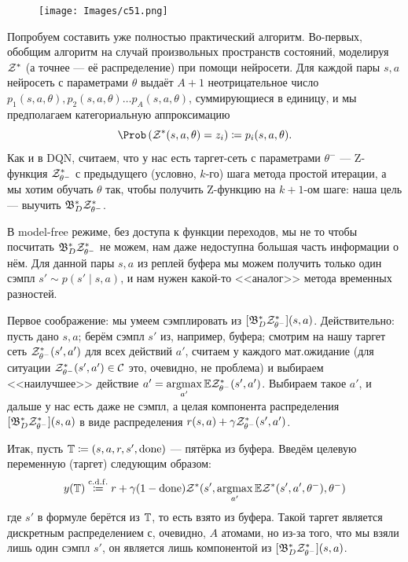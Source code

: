 \begin{figure}
\vspace{-0.5cm}
\centering
\texttt{[image: Images/c51.png]}
\vspace{-0.5cm}
\end{figure}
Попробуем составить уже полностью практический алгоритм. Во-первых, обобщим алгоритм на случай произвольных пространств состояний, моделируя $\mathcal{Z}^*$ (а точнее --- её распределение) при помощи нейросети. Для каждой пары $s, a$ нейросеть с параметрами $\theta$ выдаёт $A+1$ неотрицательное число $p_1(s, a, \theta), p_2(s, a, \theta) \dots p_A(s, a, \theta)$, суммирующиеся в единицу, и мы предполагаем категориальную аппроксимацию
\begin{equation}\label{neural_categorical}
\Prob \left( \Z^*(s, a, \theta) = z_i \right) \coloneqq p_i(s, a, \theta).
\end{equation}
Как и в DQN, считаем, что у нас есть таргет-сеть с параметрами $\theta^{-}$ --- Z-функция $\mathcal{Z}^*_{\theta^-}$ с предыдущего (условно, $k$-го) шага метода простой итерации, а мы хотим обучать $\theta$ так, чтобы получить Z-функцию на $k+1$-ом шаге: наша цель --- выучить $\mathfrak{B}^*_D \mathcal{Z}^*_{\theta^-}$. 

В model-free режиме, без доступа к функции переходов, мы не то чтобы посчитать $\mathfrak{B}^*_D \mathcal{Z}^*_{\theta^-}$ не можем, нам даже недоступна большая часть информации о нём. Для данной пары $s, a$ из реплей буфера мы можем получить только один сэмпл $s' \sim p(s' \mid s, a)$, и нам нужен какой-то <<аналог>> метода временных разностей.

Первое соображение: мы умеем сэмплировать из $[\mathfrak{B}^*_D \mathcal{Z}^*_{\theta^-}](s, a)$. Действительно: пусть дано $s, a$; берём сэмпл $s'$ из, например, буфера; смотрим на нашу таргет сеть $\mathcal{Z}^*_{\theta^-}(s', a')$ для всех действий $a'$, считаем у каждого мат.ожидание (для ситуации $\mathcal{Z}^*_{\theta^-}(s', a') \in \mathcal{C}$ это, очевидно, не проблема) и выбираем <<наилучшее>> действие $a' \HM= \argmax\limits_{a'} \E \Z^*_{\theta^-}(s', a')$. Выбираем такое $a'$, и дальше у нас есть даже не сэмпл, а целая компонента распределения $[\mathfrak{B}^*_D \mathcal{Z}^*_{\theta^-}](s, a)$ в виде распределения $r(s, a) + \gamma \mathcal{Z}^*_{\theta^-}(s', a')$. 

Итак, пусть $\mathbb{T} \coloneqq (s, a, r, s', \mathrm{done})$ --- пятёрка из буфера. Введём целевую переменную (таргет) следующим образом:
\begin{equation}\label{distributionaltarget}
y(\mathbb{T}) \mathrel{\stackrel{\mathrm{c.d.f.}}\coloneqq} r + \gamma (1 - \mathrm{done}) \mathcal{Z}^*(s', \mathop{\mathrm{argmax}}_{a'} \mathbb{E} \mathcal{Z}^*(s', a', \theta^{-}), \theta^{-})
\end{equation}
где $s'$ в формуле берётся из $\mathbb{T}$, то есть взято из буфера. Такой таргет является дискретным распределением с, очевидно, $A$ атомами, но из-за того, что мы взяли лишь один сэмпл $s'$, он является лишь компонентой из $[\mathfrak{B}^*_D \mathcal{Z}^*_{\theta^-}](s, a)$.

